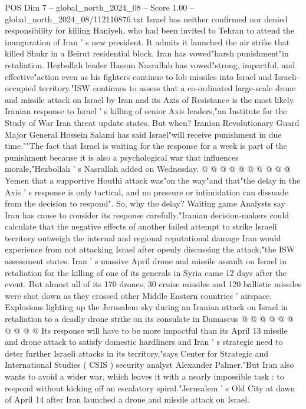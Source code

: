 \begin{textsample}{POS Dim 7 – global\_north\_2024\_08 – Score 1.00 – global\_north\_2024\_08/112110876.txt}  \label{ex:f7_pos_363}
Israel has neither confirmed nor denied responsibility for killing Haniyeh, who had been invited to Tehran to attend the inauguration of Iran ' s new president.
It admits it launched the air strike that killed Shukr in a Beirut residential block.
Iran has vowed"harsh punishment"in retaliation.
Hezbollah leader Hassan Nasrallah has vowed"strong, impactful, and effective"action even as his fighters continue to lob missiles into Israel and Israeli-occupied territory."ISW continues to assess that a co-ordinated large-scale drone and missile attack on Israel by Iran and its Axis of Resistance is the most likely Iranian response to Israel ' s killing of senior Axis leaders,"an Institute for the Study of War Iran threat update states.
But when?
Iranian Revolutionary Guard Major General Hossein Salami has said Israel"will receive punishment in due time.""The fact that Israel is waiting for the response for a week is part of the punishment because it is also a psychological war that influences morale,"Hezbollah ' s Nasrallah added on Wednesday. @ @ @ @ @ @ @ @ @ @ Yemen that a supportive Houthi attack was"on the way"and that"the delay in the Axis ' s response is only tactical, and no pressure or intimidation can dissuade from the decision to respond".
So, why the delay?
Waiting game Analysts say Iran has cause to consider its response carefully."Iranian decision-makers could calculate that the negative effects of another failed attempt to strike Israeli territory outweigh the internal and regional reputational damage Iran would experience from not attacking Israel after openly discussing the attack,"the ISW assessment states.
Iran ' s massive April drone and missile assault on Israel in retaliation for the killing of one of its generals in Syria came 12 days after the event.
But almost all of its 170 drones, 30 cruise missiles and 120 ballistic missiles were shot down as they crossed other Middle Eastern countries ' airspace.
Explosions lighting up the Jerusalem sky during an Iranian attack on Israel in retaliation to a deadly drone strike on its consulate in Damascus @ @ @ @ @ @ @ @ @ @ Its response will have to be more impactful than its April 13 missile and drone attack to satisfy domestic hardliners and Iran ' s strategic need to deter further Israeli attacks in its territory,"says Center for Strategic and International Studies ( CSIS ) security analyst Alexander Palmer."But Iran also wants to avoid a wider war, which leaves it with a nearly impossible task : to respond without kicking off an escalatory spiral."Jerusalem ' s Old City at dawn of April 14 after Iran launched a drone and missile attack on Israel.

\end{textsample}
